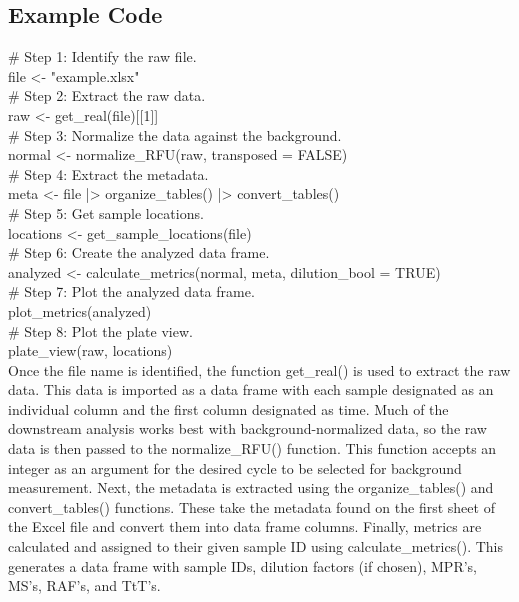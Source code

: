 \documentclass[preprint,12pt,a4paper]{elsarticle}
\begin{document}
        \subsection{Example Code}
            \# Step 1: Identify the raw file.\\
            file <- "example.xlsx"\\

            \# Step 2: Extract the raw data.\\
            raw <- get\_real(file)[[1]]\\

            \# Step 3: Normalize the data against the background.\\
            normal <- normalize\_RFU(raw, transposed = FALSE)\\

            \# Step 4: Extract the metadata.\\
            meta <- file |> organize\_tables() |> convert\_tables()\\

            \# Step 5: Get sample locations.\\
            locations <- get\_sample\_locations(file)\\
            
            \# Step 6: Create the analyzed data frame.\\
            analyzed <- calculate\_metrics(normal, meta, dilution\_bool = TRUE)\\

            \# Step 7: Plot the analyzed data frame.\\
            plot\_metrics(analyzed)\\

            \# Step 8: Plot the plate view.\\
            plate\_view(raw, locations)\\

            Once the file name is identified, the function get\_real() is used to extract the raw data. This data is imported as a data frame with each sample designated as an individual column and the first column designated as time. Much of the downstream analysis works best with background-normalized data, so the raw data is then passed to the normalize\_RFU() function. This function accepts an integer as an argument for the desired cycle to be selected for background measurement. Next, the metadata is extracted using the organize\_tables() and convert\_tables() functions. These take the metadata found on the first sheet of the Excel file and convert them into data frame columns. Finally, metrics are calculated and assigned to their given sample ID using calculate\_metrics(). This generates a data frame with sample IDs, dilution factors (if chosen), MPR's, MS's, RAF's, and TtT's.
\end{document}

